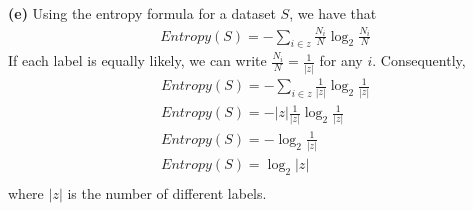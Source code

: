 \documentclass[leqno]{article}
\begin{document}
\hfill

\noindent \textbf{(e)} Using the entropy formula for a dataset $S$, we have that
\begin{equation*}
\begin{split}
&Entropy(S) = -\sum_{i \in z}\frac{N_i}{N}\log_2\frac{N_i}{N}
\end{split}
\end{equation*} 
If each label is equally likely, we can write $\frac{N_i}{N} = \frac{1}{|z|}$ for any $i$. Consequently,
\begin{equation*}
\begin{split}
&Entropy(S) = -\sum_{i \in z}\frac{1}{|z|}\log_2\frac{1}{|z|}\\
&Entropy(S) = -|z|\frac{1}{|z|}\log_2\frac{1}{|z|}\\
&Entropy(S) = -\log_2\frac{1}{|z|}\\
&Entropy(S) = \log_2|z|\\
\end{split}
\end{equation*}
where $|z|$ is the number of different labels.  
\end{document}
